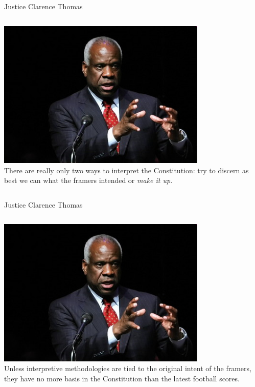 \documentclass{beamer}
\begin{document}
\begin{frame}{Justice Clarence Thomas}
    \begin{columns}[onlytextwidth]
            \centering
            \includegraphics[width=0.75\textwidth]{img/clarence-thomas.png} \\
            There are really only two ways to interpret the Constitution: try to discern as best we can what the framers intended or \emph{make it up}.
    \end{columns}
\end{frame}

\begin{frame}{Justice Clarence Thomas}
    \begin{columns}[onlytextwidth]
            \centering
            \includegraphics[width=0.75\textwidth]{img/clarence-thomas.png} \\
        Unless interpretive methodologies are tied to the original intent of the framers, they have no more basis in the Constitution than the latest football scores.
    \end{columns}
\end{frame}
\end{document}
